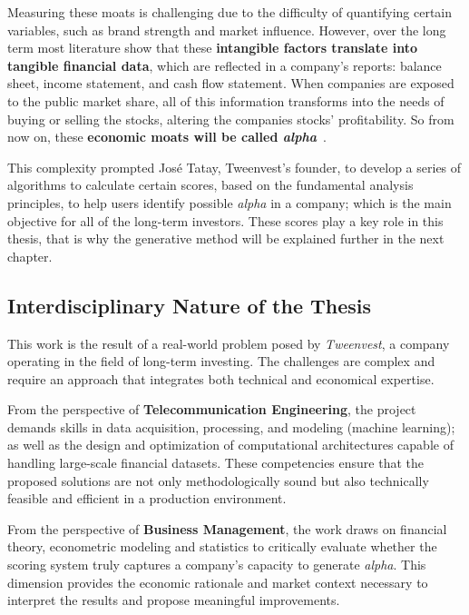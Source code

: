 \documentclass[11pt,english,a4paper,hidelinks]{book}
\begin{document}
\vspace{0.5cm}
\noindent Measuring these moats is challenging due to the difficulty of quantifying certain variables, such as brand strength and market influence. However, over the long term most literature show that these \textbf{intangible factors translate into tangible financial data}, which are reflected in a company's reports: balance sheet, income statement, and cash flow statement. When companies are exposed to the public market share, all of this information transforms into the needs of buying or selling the stocks, altering the companies stocks' profitability. So from now on, these \textbf{economic moats will be called \textit{alpha}}~\cite{sharpe1964capm}.

\vspace{0.5cm}
\noindent This complexity prompted José Tatay, Tweenvest's founder, to develop a series of algorithms to calculate certain scores, based on the fundamental analysis principles, to help users identify possible \textit{alpha} in a company; which is the main objective for all of the long-term investors. These scores play a key role in this thesis, that is why the generative method will be explained further in the next chapter.

\subsection{Interdisciplinary Nature of the Thesis}

\noindent This work is the result of a real-world problem posed by \textit{Tweenvest}, a company operating in the field of long-term investing. The challenges are complex and require an approach that integrates both technical and economical expertise.

\vspace{0.5cm}
\noindent From the perspective of \textbf{Telecommunication Engineering}, the project demands skills in data acquisition, processing, and modeling (machine learning); as well as the design and optimization of computational architectures capable of handling large-scale financial datasets. These competencies ensure that the proposed solutions are not only methodologically sound but also technically feasible and efficient in a production environment.

\vspace{0.5cm}
\noindent From the perspective of \textbf{Business Management}, the work draws on financial theory, econometric modeling and statistics to critically evaluate whether the scoring system truly captures a company’s capacity to generate \textit{alpha}. This dimension provides the economic rationale and market context necessary to interpret the results and propose meaningful improvements.
\end{document}
